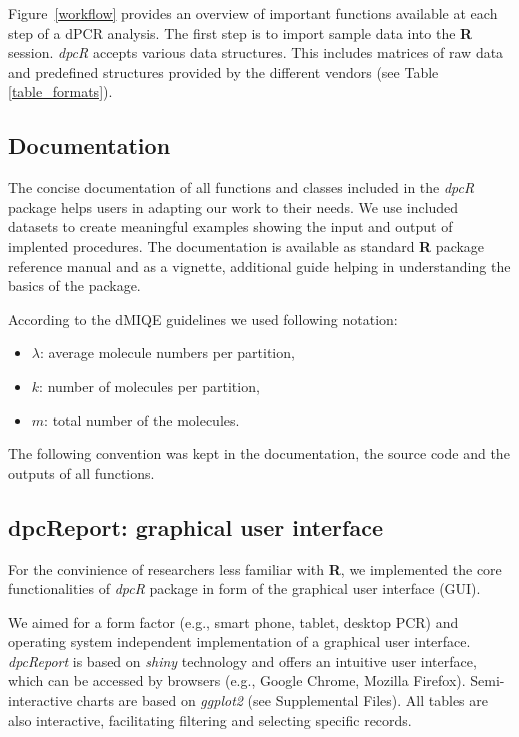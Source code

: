 \documentclass[a4,center,fleqn]{NAR}
\begin{document}
Figure~\ref{workflow} provides an overview of important functions available at 
each step of a dPCR analysis. The first step is to import sample data into the 
\textbf{R} session. \textit{dpcR} accepts various data structures. This 
includes 
matrices of raw data and predefined structures provided by the different 
vendors 
(see Table \ref{table_formats}). 


\subsection{Documentation}

The concise documentation of all functions and classes included in the 
\textit{dpcR} package helps users in adapting our work to their needs. We use 
included datasets to create meaningful examples showing the input and output of 
implented procedures. The documentation is available as standard \textbf{R} 
package reference manual and as a vignette, additional guide helping in 
understanding the basics of the package.

According to the dMIQE guidelines \cite{huggett_digital_2013} we used following 
notation:
\begin{itemize}
 \item $\lambda$: average molecule numbers per partition,
 \item $k$: number of molecules per partition,
 \item $m$: total number of the molecules.
\end{itemize}

The following convention was kept in the documentation, the source code and the 
outputs of all functions.


\subsection{dpcReport: graphical user interface}

For the convinience of researchers less familiar with \textbf{R}, we 
implemented the core functionalities of \textit{dpcR} package in form of 
the graphical user interface (GUI).

We aimed for a form factor (e.g., smart phone, tablet, desktop PCR) and 
operating system independent implementation of a graphical user interface. 
\textit{dpcReport} is based on \textit{shiny} technology and offers an intuitive 
user interface, which can be accessed by browsers (e.g., Google Chrome, Mozilla 
Firefox). Semi-interactive charts are based on \textit{ggplot2} (see 
Supplemental Files). All tables are also interactive, facilitating filtering 
and selecting specific records.
\end{document}
